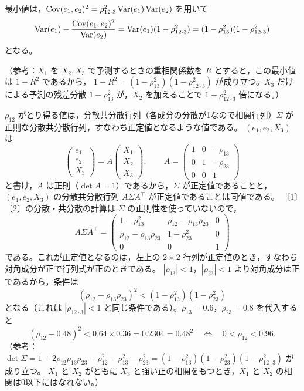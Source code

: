 \documentclass[a4paper,11pt]{ltjsarticle}
\begin{document}
最小値は，$\operatorname{Cov}(e_1,e_2)^2=\rho_{12\cdot3}^2\operatorname{Var}(e_1)\operatorname{Var}(e_2)$ を用いて
\[
\operatorname{Var}(e_1)-\frac{\operatorname{Cov}(e_1,e_2)^2}{\operatorname{Var}(e_2)}=\operatorname{Var}(e_1)(1-\rho_{12\cdot3}^2)=(1-\rho_{13}^2)(1-\rho_{12\cdot3}^2)
\]
となる。

（参考：$X_1$ を $X_2,X_3$ で予測するときの重相関係数を $R$ とすると，この最小値は $1-R^2$ であるから，
$1-R^2=(1-\rho_{13}^2)(1-\rho_{12\cdot3}^2)$ が成り立つ。$X_3$ だけによる予測の残差分散 $1-\rho_{13}^2$ が，$X_2$ を加えることで $1-\rho_{12\cdot3}^2$ 倍になる。）

$\rho_{12}$ がとり得る値は，分散共分散行列（各成分の分散が1なので相関行列）$\Sigma$ が正則な分散共分散行列，すなわち正定値となるような値である。
$(e_1,e_2,X_3)$ は
\[
\begin{pmatrix}e_1\\e_2\\X_3\end{pmatrix}=A\begin{pmatrix}X_1\\X_2\\X_3\end{pmatrix},\qquad
A=\begin{pmatrix}1&0&-\rho_{13}\\0&1&-\rho_{23}\\0&0&1\end{pmatrix}
\]
と書け，$A$ は正則（$\det A=1$）であるから，$\Sigma$ が正定値であることと，$(e_1,e_2,X_3)$ の分散共分散行列 $A\Sigma A^\top$ が正定値であることは同値である。
〔1〕〔2〕の分散・共分散の計算は $\Sigma$ の正則性を使っていないので，
\[
A\Sigma A^\top=\begin{pmatrix}1-\rho_{13}^2&\rho_{12}-\rho_{13}\rho_{23}&0\\ \rho_{12}-\rho_{13}\rho_{23}&1-\rho_{23}^2&0\\0&0&1\end{pmatrix}
\]
である。これが正定値となるのは，左上の $2\times2$ 行列が正定値のとき，すなわち対角成分が正で行列式が正のときである。
$|\rho_{13}|<1$，$|\rho_{23}|<1$ より対角成分は正であるから，条件は
\[
(\rho_{12}-\rho_{13}\rho_{23})^2<(1-\rho_{13}^2)(1-\rho_{23}^2)
\]
となる（これは $|\rho_{12\cdot3}|<1$ と同じ条件である）。$\rho_{13}=0.6$，$\rho_{23}=0.8$ を代入すると
\[
(\rho_{12}-0.48)^2<0.64\times0.36=0.2304=0.48^2
\quad\Longleftrightarrow\quad\boxed{0<\rho_{12}<0.96}.
\]
（参考：$\det\Sigma=1+2\rho_{12}\rho_{13}\rho_{23}-\rho_{12}^2-\rho_{13}^2-\rho_{23}^2=(1-\rho_{13}^2)(1-\rho_{23}^2)(1-\rho_{12\cdot3}^2)$ が成り立つ。
$X_1$ と $X_2$ がともに $X_3$ と強い正の相関をもつとき，$X_1$ と $X_2$ の相関は0以下にはなれない。）
\end{document}
